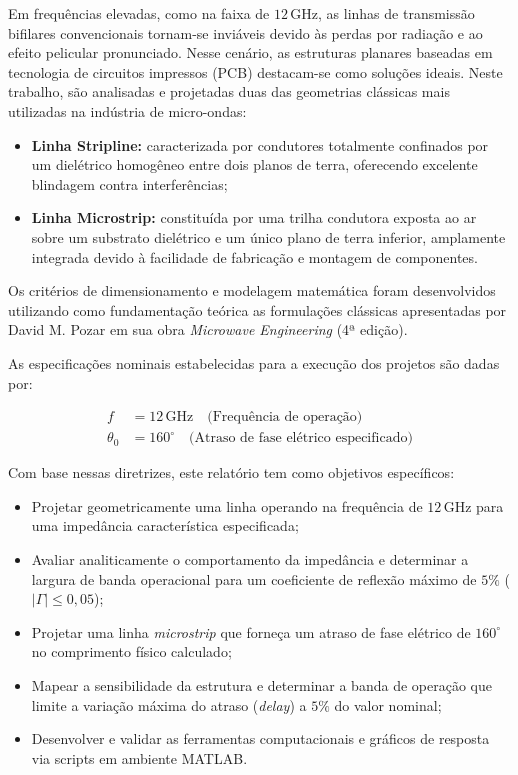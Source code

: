 \documentclass[12pt,a4paper]{report}
\begin{document}
Em frequências elevadas, como na faixa de $12\,\text{GHz}$, as linhas de transmissão bifilares convencionais tornam-se inviáveis devido às perdas por radiação e ao efeito pelicular pronunciado. Nesse cenário, as estruturas planares baseadas em tecnologia de circuitos impressos (PCB) destacam-se como soluções ideais. Neste trabalho, são analisadas e projetadas duas das geometrias clássicas mais utilizadas na indústria de micro-ondas:

\begin{itemize}
    \item \textbf{Linha Stripline:} caracterizada por condutores totalmente confinados por um dielétrico homogêneo entre dois planos de terra, oferecendo excelente blindagem contra interferências;
    \item \textbf{Linha Microstrip:} constituída por uma trilha condutora exposta ao ar sobre um substrato dielétrico e um único plano de terra inferior, amplamente integrada devido à facilidade de fabricação e montagem de componentes.
\end{itemize}

Os critérios de dimensionamento e modelagem matemática foram desenvolvidos utilizando como fundamentação teórica as formulações clássicas apresentadas por David M. Pozar em sua obra \textit{Microwave Engineering} (4ª edição).

As especificações nominais estabelecidas para a execução dos projetos são dadas por:

\begin{align*}
f &= 12\,\text{GHz} \quad \text{(Frequência de operação)} \\
\theta_0 &= 160^{\circ} \quad \text{(Atraso de fase elétrico especificado)}
\end{align*}

\newpage

Com base nessas diretrizes, este relatório tem como objetivos específicos:

\begin{itemize}
    \item Projetar geometricamente uma linha  operando na frequência de $12 \,\text{GHz}$ para uma impedância característica especificada;
    \item Avaliar analiticamente o comportamento da impedância e determinar a largura de banda operacional para um coeficiente de reflexão máximo de $5\%$ ($|\Gamma| \le 0,05$);
    \item Projetar uma linha \textit{microstrip} que forneça um atraso de fase elétrico de $160^{\circ}$ no comprimento físico calculado;
    \item Mapear a sensibilidade da estrutura e determinar a banda de operação que limite a variação máxima do atraso (\textit{delay}) a $5\%$ do valor nominal;
    \item Desenvolver e validar as ferramentas computacionais e gráficos de resposta via scripts em ambiente MATLAB.
\end{itemize}
\end{document}
